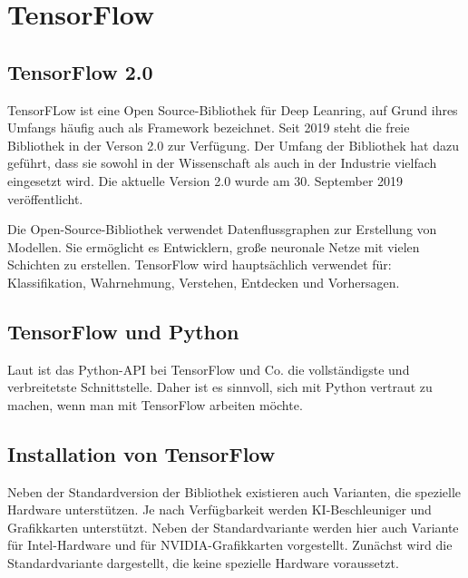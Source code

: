 %
%
%



\chapter{TensorFlow} \label{Kapitel_TF}

\section{TensorFlow 2.0} 
 
TensorFLow ist eine Open Source-Bibliothek für Deep Leanring, auf Grund ihres Umfangs häufig auch als Framework bezeichnet. Seit 2019 steht die freie Bibliothek in der Verson 2.0 zur Verfügung. Der Umfang der Bibliothek hat dazu geführt, dass sie sowohl in der Wissenschaft als auch in der Industrie vielfach eingesetzt wird. Die aktuelle Version 2.0 wurde am 30. September 2019 veröffentlicht.
 \cite{GoogleTensorFlow:2019}

Die Open-Source-Bibliothek verwendet Datenflussgraphen zur Erstellung von Modellen.  Sie ermöglicht es Entwicklern, große neuronale Netze mit vielen Schichten zu erstellen. TensorFlow wird hauptsächlich verwendet für: Klassifikation, Wahrnehmung, Verstehen, Entdecken und Vorhersagen. \cite{GoogleTensorFlow:2019} %

\section{TensorFlow und Python}

Laut \cite{Heise:2020} ist das Python-API bei TensorFlow und Co. die vollständigste und verbreitetste Schnittstelle. Daher ist es sinnvoll, sich mit Python vertraut zu machen, wenn man mit TensorFlow arbeiten möchte. 




\section{Installation von TensorFlow}

Neben der Standardversion der Bibliothek existieren auch Varianten, die spezielle Hardware unterstützen. Je nach Verfügbarkeit werden KI-Beschleuniger und Grafikkarten unterstützt. Neben der Standardvariante werden hier auch Variante für Intel-Hardware und für NVIDIA-Grafikkarten vorgestellt. Zunächst wird die Standardvariante dargestellt, die keine spezielle Hardware voraussetzt.



